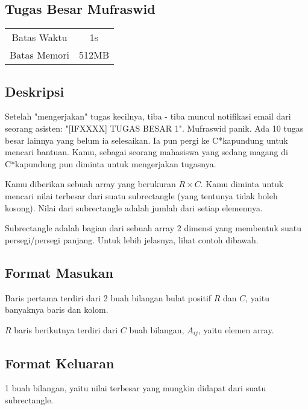 \documentclass{article}
\begin{document}
\begin{center}
    \section*{Tugas Besar Mufraswid} %

    \begin{tabular}{ | c c | }
        \hline
        Batas Waktu  & 1s \\    %
        Batas Memori & 512MB \\  %
        \hline
    \end{tabular}
\end{center}

\subsection*{Deskripsi}

Setelah "mengerjakan" tugas kecilnya, tiba - tiba muncul notifikasi email dari seorang asisten: "[IFXXXX] TUGAS BESAR 1". Mufraswid panik. Ada 10 tugas besar lainnya yang belum ia selesaikan. Ia pun pergi ke C*kapundung untuk mencari bantuan. Kamu, sebagai seorang mahasiswa yang sedang magang di C*kapundung pun diminta untuk mengerjakan tugasnya.
\par
Kamu diberikan sebuah array yang berukuran $R \times C$. Kamu diminta untuk mencari nilai terbesar dari suatu subrectangle (yang tentunya tidak boleh kosong). Nilai dari subrectangle adalah jumlah dari setiap elemennya.
\par
Subrectangle adalah bagian dari sebuah array 2 dimensi yang membentuk suatu persegi/persegi panjang. Untuk lebih jelasnya, lihat contoh dibawah.

\subsection*{Format Masukan}

Baris pertama terdiri dari 2 buah bilangan bulat positif $R$ dan $C$, yaitu banyaknya baris dan kolom.
\par
$R$ baris berikutnya terdiri dari $C$ buah bilangan, $A_{ij}$, yaitu elemen array.

\subsection*{Format Keluaran}

1 buah bilangan, yaitu nilai terbesar yang mungkin didapat dari suatu subrectangle.
\end{document}
